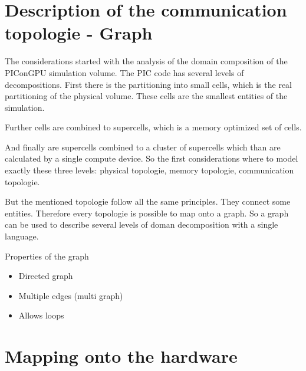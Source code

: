 \section{Description of the communication topologie - Graph}
The considerations started with the analysis of the domain composition
of the PIConGPU simulation volume. The PIC code has several levels of
decompositions. First there is the partitioning into small cells,
which is the real partitioning of the physical volume. These cells are
the smallest entities of the simulation.

Further cells are combined to supercells, which is a memory optimized
set of cells.

And finally are supercells combined to a cluster of supercells which
than are calculated by a single compute device. So the first
considerations where to model exactly these three levels: physical
topologie, memory topologie, communication topologie.

But the mentioned topologie follow all the same principles. They
connect some entities. Therefore every topologie is possible to map
onto a graph.  So a graph can be used to describe several levels of
doman decomposition with a single language.

Properties of the graph
\begin{itemize}
  \item Directed graph
  \item Multiple edges (multi graph)
  \item Allows loops
\end{itemize}

\section{Mapping onto the hardware}

